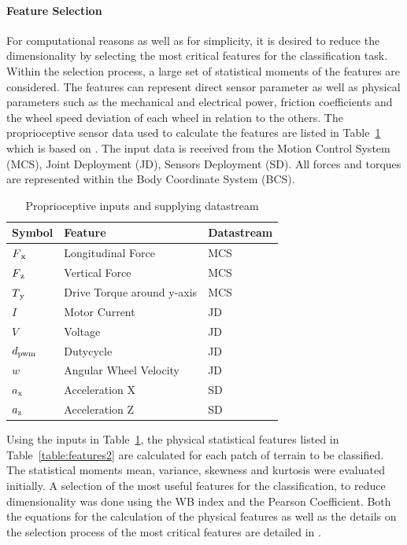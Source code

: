 \documentclass{article}
\begin{document}
\paragraph*{Feature Selection}
For computational reasons as well as for simplicity, it is desired to reduce the dimensionality by selecting the most critical features for the  classification task.
Within the selection process, a large set of statistical moments of the features are considered. 
The features can represent direct sensor parameter as well as physical parameters such as the mechanical and electrical power, friction coefficients and the wheel speed deviation of each wheel in relation to the others. 
The proprioceptive sensor data used to calculate the features are listed in Table~\ref{table:features1} which is based on \cite{Dimastrogiovanni2020}.
The input data is received from the Motion Control System (MCS), Joint Deployment (JD), Sensors Deployment (SD). 
All forces and torques are represented within the Body Coordinate System (BCS).

\begin{table}[!htbp]
   \centering
    \begin{tabularx}{\columnwidth}{XXX}
    \textbf{Symbol}& \textbf{Feature} & \textbf{Datastream}  \\
    \hline
      $F\textsubscript{x}$ & Longitudinal Force	 &  MCS\\
      $F\textsubscript{z}$& Vertical Force	 &MCS \\ 
      $T\textsubscript{y}$& Drive Torque around y-axis	   &MCS\\ 
      $I $& Motor Current	  & JD\\ 
      $V$ & Voltage 	   &JD\\ 
      $d\textsubscript{pwm}$&  Dutycycle	   &JD\\ 
      $w$& Angular Wheel Velocity 	 &JD \\
      $a\textsubscript{x}$& Acceleration X	  &SD\\ 
      $a\textsubscript{z}$&  Acceleration Z	   &SD\\ 
    \end{tabularx}
    \caption{Proprioceptive inputs and supplying datastream}
    \label{table:features1}
\end{table}

Using the inputs in Table~\ref{table:features1}, the physical statistical features listed in Table~\ref{table:features2} are calculated for each patch of terrain to be classified.
The statistical moments mean, variance, skewness and kurtosis were evaluated initially. 
A selection of the most useful features for the classification, to reduce dimensionality was done using the WB index and the Pearson Coefficient.
Both the equations for the calculation of the physical features as well as the details on the selection process of the most critical features are detailed in \cite{Dimastrogiovanni2020}.
\end{document}
